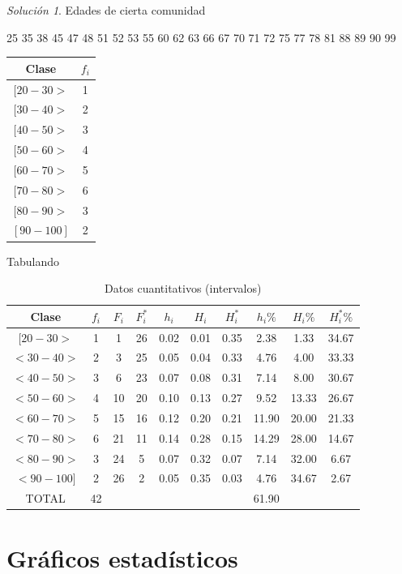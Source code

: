 \documentclass[
  10pt,
]{krantz}
\theoremstyle{definition}
\theoremstyle{definition}
\theoremstyle{definition}
\theoremstyle{definition}
\theoremstyle{remark}
\newtheorem*{solution}{Solución}
\begin{document}
\begin{solution}
{}
Edades de cierta comunidad

25
35 38
45 47 48
51 52 53 55
60 62 63 66 67
70 71 72 75 77 78
81 88 89
90 99

\begin{longtable}[]{@{}cc@{}}
\toprule
Clase & \(f_i\) \\
\midrule
\endhead
\([20-30>\) & 1 \\
\([30-40>\) & 2 \\
\([40-50>\) & 3 \\
\([50-60>\) & 4 \\
\([60-70>\) & 5 \\
\([70-80>\) & 6 \\
\([80-90>\) & 3 \\
\([90-100]\) & 2 \\
\bottomrule
\end{longtable}
\end{solution}

Tabulando

\begin{longtable}[t]{cccccccccc}
\caption{\label{tab:cuantitativa}Datos cuantitativos (intervalos)}\\
\toprule
Clase & $f_i$ & $F_i$ & $F_i^*$ & $h_i$ & $H_i$ & $H_i^*$ & $h_i\%$ & $H_i\%$ & $H_i^*\%$\\
\midrule
$[20-30>$ & 1 & 1 & 26 & 0.02 & 0.01 & 0.35 & 2.38 & 1.33 & 34.67\\
$<30-40>$ & 2 & 3 & 25 & 0.05 & 0.04 & 0.33 & 4.76 & 4.00 & 33.33\\
$<40-50>$ & 3 & 6 & 23 & 0.07 & 0.08 & 0.31 & 7.14 & 8.00 & 30.67\\
$<50-60>$ & 4 & 10 & 20 & 0.10 & 0.13 & 0.27 & 9.52 & 13.33 & 26.67\\
$<60-70>$ & 5 & 15 & 16 & 0.12 & 0.20 & 0.21 & 11.90 & 20.00 & 21.33\\
$<70-80>$ & 6 & 21 & 11 & 0.14 & 0.28 & 0.15 & 14.29 & 28.00 & 14.67\\
$<80-90>$ & 3 & 24 & 5 & 0.07 & 0.32 & 0.07 & 7.14 & 32.00 & 6.67\\
$<90-100]$ & 2 & 26 & 2 & 0.05 & 0.35 & 0.03 & 4.76 & 34.67 & 2.67\\
TOTAL & 42 &  &  &  &  &  & 61.90 &  & \\
\bottomrule
\end{longtable}

\hypertarget{gruxe1ficos-estaduxedsticos}{%
\chapter{Gráficos estadísticos}\label{gruxe1ficos-estaduxedsticos}}
\end{document}
